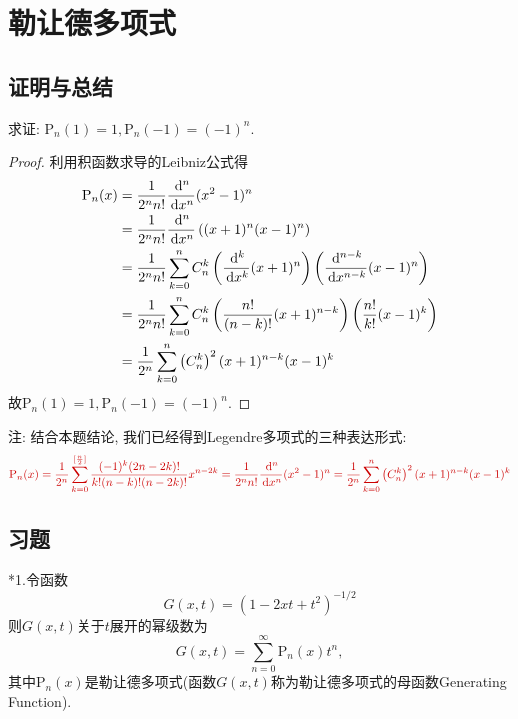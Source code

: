\section{勒让德多项式}


\subsection{证明与总结}


求证: $\mathrm{P}_n(1)=1,\mathrm{P}_n(-1)=(-1)^n$.

\begin{proof}
利用积函数求导的Leibniz公式得
\[\begin{split}
\mathrm{P}_n(x)&=\frac{1}{2^nn!}\frac{\,\mathrm{d}^n}{\,\mathrm{d} x^n}(x^2-1)^n\\
&=\frac{1}{2^nn!}\frac{\,\mathrm{d}^n}{\,\mathrm{d} x^n}\left((x+1)^n(x-1)^n\right)\\
&=\frac{1}{2^nn!}\sum_{k=0}^nC_n^k\left(\frac{\,\mathrm{d}^k}{\,\mathrm{d} x^k}(x+1)^n\right)\left(\frac{\,\mathrm{d}^{n-k}}{\,\mathrm{d} x^{n-k}}(x-1)^n\right)\\
&=\frac{1}{2^nn!}\sum_{k=0}^nC_n^k\left(\frac{n!}{(n-k)!}(x+1)^{n-k}\right)\left(\frac{n!}{k!}(x-1)^k\right)\\
&=\frac{1}{2^n}\sum_{k=0}^n\left(C_n^k\right)^2(x+1)^{n-k}(x-1)^k
\end{split}\]
故$\mathrm{P}_n(1)=1,\mathrm{P}_n(-1)=(-1)^n$.
\end{proof}

注: 结合本题结论, 我们已经得到Legendre多项式的三种表达形式:\raggedbottom
\[{\color{bostonuniversityred}\mathrm{P}_n(x)=\frac{1}{2^n}\sum_{k=0}^{[\frac{n}{2}]}\frac{(-1)^k(2n-2k)!}{k!(n-k)!(n-2k)!}x^{n-2k}=\frac{1}{2^nn!}\frac{\diff^n}{\diff x^n}(x^2-1)^n=\frac{1}{2^n}\sum_{k=0}^n\left(C_n^k\right)^2(x+1)^{n-k}(x-1)^k}\]


\subsection{习题}


*1.令函数\[G(x,t)=(1-2xt+t^2)^{-1/2}\]
则$G(x,t)$关于$t$展开的幂级数为
\[G(x,t)=\sum_{n=0}^{\infty}\mathrm{P}_n(x)t^n,\]
其中$\mathrm{P}_n(x)$是勒让德多项式(函数$G(x,t)$称为勒让德多项式的母函数Generating Function).

